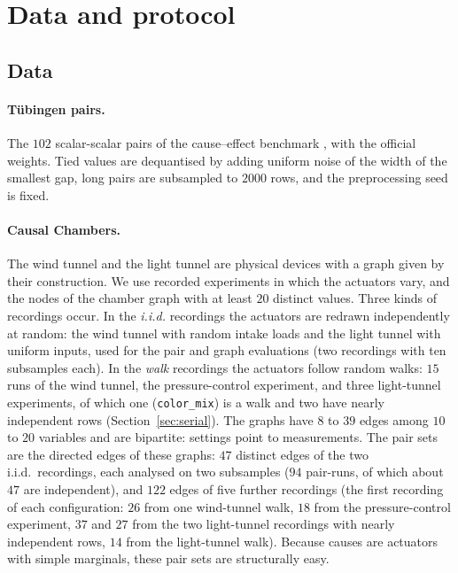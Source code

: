 
\section{Data and protocol}\label{sec:data}

\subsection{Data}

\paragraph{Tübingen pairs.} The $102$ scalar-scalar pairs of the cause--effect benchmark
\citep{mooij2016distinguishing}, with the official weights. Tied values are dequantised by
adding uniform noise of the width of the smallest gap, long pairs are subsampled to $2000$
rows, and the preprocessing seed is fixed.

\paragraph{Causal Chambers.} The wind tunnel and the light tunnel \citep{gamella2025chamber}
are physical devices with a graph given by their construction. We use recorded experiments
in which the actuators vary, and the nodes of the chamber graph with at least $20$ distinct
values. Three kinds of recordings occur. In the \emph{i.i.d.} recordings the actuators are
redrawn independently at random: the wind tunnel with random intake loads and the light
tunnel with uniform inputs, used for the pair and graph evaluations (two recordings with
ten subsamples each). In the \emph{walk} recordings the actuators follow random walks:
$15$ runs of the wind tunnel, the pressure-control experiment, and three light-tunnel
experiments, of which one (\texttt{color\_mix}) is a walk and two have nearly independent rows
(Section~\ref{sec:serial}). The graphs have $8$ to $39$ edges among $10$ to $20$ variables
and are bipartite: settings point to measurements. The pair sets are the directed edges of these
graphs: $47$ distinct edges of the two i.i.d.\ recordings, each analysed on two subsamples ($94$
pair-runs, of which about $47$ are independent), and $122$ edges of five further recordings (the first
recording of each configuration: $26$ from one wind-tunnel walk, $18$ from the pressure-control
experiment, $37$ and $27$ from the two light-tunnel recordings with nearly independent rows, $14$ from
the light-tunnel walk). Because causes are actuators with simple marginals, these pair sets are
structurally easy.

